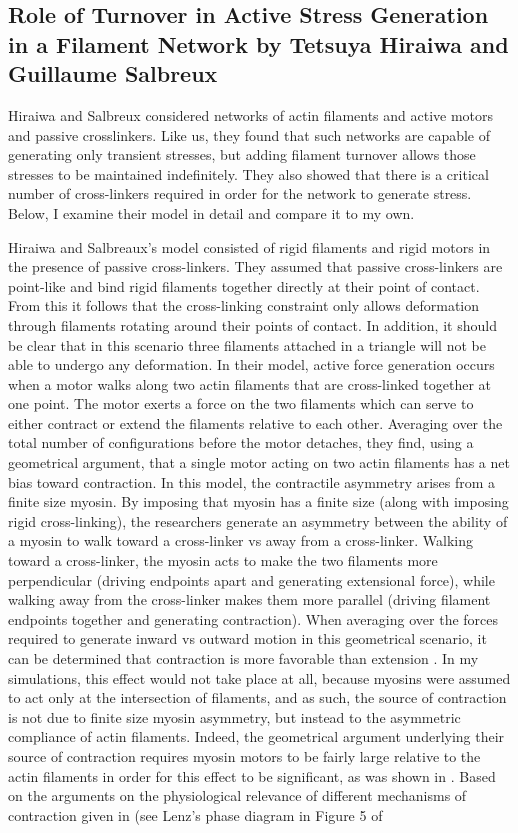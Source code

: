 \subsection{Role of Turnover in Active Stress Generation in a Filament Network by Tetsuya Hiraiwa and Guillaume Salbreux}
Hiraiwa and Salbreux \cite{2015arXiv150706182H} considered networks of actin filaments and  active motors and passive crosslinkers. Like us, they found that such networks are capable of generating only transient stresses, but adding filament turnover allows those stresses to be maintained indefinitely. They also showed that there is a critical number of cross-linkers required in order for the network to generate stress.  Below, I examine  their model in detail and compare it to my own. 

Hiraiwa and Salbreaux's model consisted of rigid filaments and rigid motors in the presence of passive cross-linkers.  They assumed that passive cross-linkers are point-like and bind rigid filaments together directly at their point of contact.  From this it follows that the cross-linking constraint only allows deformation through filaments rotating around their points of contact.  In addition, it should be clear that in this scenario three filaments attached in a triangle will not be able to undergo any deformation.  In their model, active force generation occurs when a motor walks along two actin filaments that are cross-linked together at one point.  The motor exerts a force on the two filaments which can serve to either contract or extend the filaments relative to each other.  Averaging over the total number of configurations before the motor detaches, they find, using a geometrical argument, that a single motor acting on  two actin filaments has a net bias toward contraction.  In this model, the contractile asymmetry arises from a finite size myosin.  By imposing that myosin has a finite size (along with imposing rigid cross-linking), the researchers generate an asymmetry between the ability of a myosin to walk toward a cross-linker vs away from a cross-linker.  Walking toward a cross-linker, the myosin acts to make the two filaments more perpendicular (driving endpoints apart and generating extensional force), while walking away from the cross-linker makes them more parallel (driving filament endpoints together and generating contraction). When averaging over the forces required to generate inward vs outward motion in this geometrical scenario, it can be determined that contraction is more favorable than extension \cite{PhysRevX.4.041002}. In my simulations, this effect would not take place at all, because myosins were assumed to act only at the intersection of filaments, and as such, the source of contraction is not due to  finite size myosin asymmetry, but instead to the asymmetric compliance of actin filaments.  Indeed, the geometrical argument underlying their source of contraction requires myosin motors to be fairly large relative to the actin filaments in order for this effect to be significant, as was shown in \cite{PhysRevX.4.041002}.  Based on the arguments on the physiological relevance of different mechanisms of contraction given in \cite{PhysRevX.4.041002} (see Lenz's phase diagram in Figure 5 of  